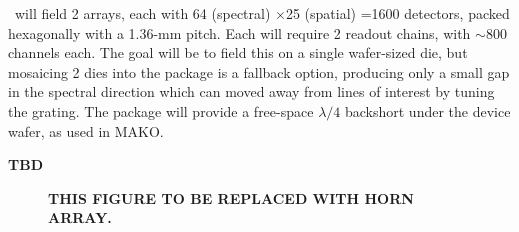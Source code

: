 \name\ will field 2 arrays, each with 64 (spectral) $\times$25 (spatial) =1600 detectors, packed hexagonally with a 1.36-mm pitch.  Each will require 2 readout chains, with $\sim$800 channels each.  The goal will be to field this on a single wafer-sized die, but mosaicing 2 dies into the package is a fallback option, producing only a small gap in the spectral direction which can moved away from lines of interest by tuning the grating.  The package will provide a free-space $\lambda/4$ backshort under the device wafer, as used in MAKO.

\vspace{0.05in}{\bf Horn array.}  {\bf \color{red} TBD}

\begin{figure}[t!]
\begin{center}
\captionbaseline\caption{\small {\bf \color{red} THIS FIGURE TO BE REPLACED WITH HORN ARRAY.}}  
\linefig\vspace{-0.35in} \label{fig:lenses}
\end{center}
\end{figure}


